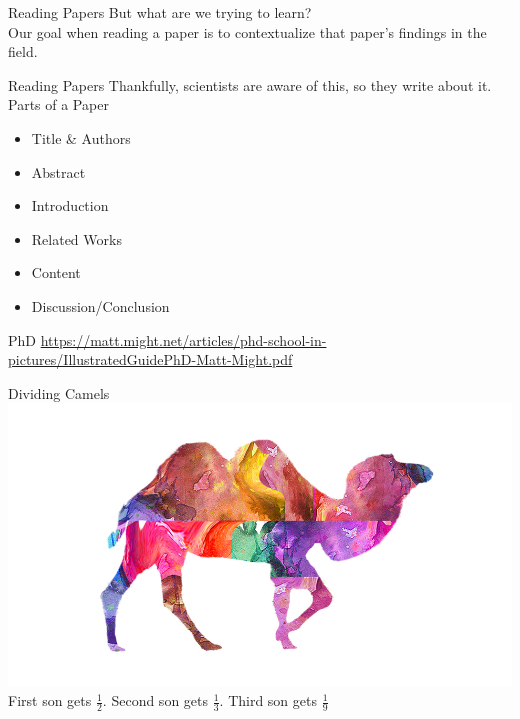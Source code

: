 \documentclass[aspectratio=169,xcolor=dvipsnames]{beamer}
\begin{document}
\begin{frame}{Reading Papers}
	But what are we trying to learn?\\\pause
	Our goal when reading a paper is to contextualize that paper's findings in the field.
\end{frame}
\begin{frame}{Reading Papers}
	Thankfully, scientists are aware of this, so they write about it.\pause
	\\Parts of a Paper
	\begin{itemize}
		\item Title \& Authors \pause
		\item Abstract \pause
		\item Introduction \pause
		\item Related Works \pause
		\item Content\pause
		\item Discussion/Conclusion
	\end{itemize}
\end{frame}
\begin{frame}{PhD}
	\url{https://matt.might.net/articles/phd-school-in-pictures/IllustratedGuidePhD-Matt-Might.pdf}
\end{frame}
\begin{frame}{Dividing Camels}
	\includegraphics[width=0.78\linewidth]{Camel}\\
	First son gets $\frac{1}{2}$. Second son gets $\frac{1}{3}$. Third son gets $\frac{1}{9}$
\end{frame}
\end{document}
